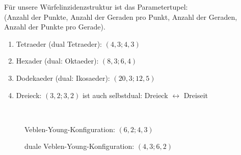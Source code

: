 \begin{beispiel}
	Für unsere Würfelinzidenzstruktur ist das Parametertupel:\\
	(Anzahl der Punkte, Anzahl der Geraden pro Punkt, Anzahl der Geraden, Anzahl der Punkte pro Gerade).
	\begin{enumerate}
		\item Tetraeder (dual Tetraeder): $(4,3;4,3)$ 
		\item Hexader (dual: Oktaeder): $(8,3;6,4)$
		\item Dodekaeder (dual: Ikosaeder): $(20,3;12,5)$
		\item Dreieck: $(3,2;3,2)$ ist auch selbstdual: Dreieck $\leftrightarrow$ Dreiseit
	\end{enumerate}
\end{beispiel}

\begin{beispiel}\
	\begin{figure}[H] %
		\begin{center}
			
			\caption{Veblen-Young-Konfiguration: $(6,2;4,3)$}
		\end{center}
	\end{figure}
	\begin{figure}[H] %
		\begin{center}
			
			\caption{duale Veblen-Young-Konfiguration: $(4,3;6,2)$}
		\end{center}
	\end{figure}	
\end{beispiel}

